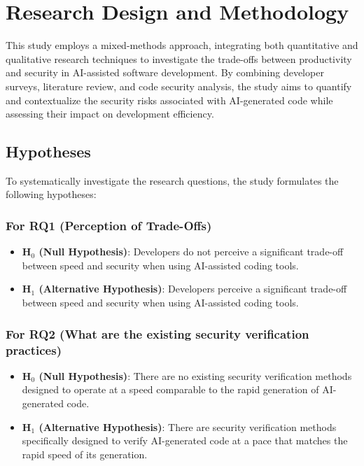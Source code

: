 \section{Research Design and Methodology}
This study employs a mixed-methods approach, integrating both quantitative and qualitative research techniques to investigate the trade-offs between productivity and security in AI-assisted software development. By combining developer surveys, literature review, and code security analysis, the study aims to quantify and contextualize the security risks associated with AI-generated code while assessing their impact on development efficiency.

\subsection{Hypotheses}

To systematically investigate the research questions, the study formulates the following hypotheses:

\subsubsection{For RQ1 (Perception of Trade-Offs)}

\begin{itemize}
    \item \textbf{H$_{0}$ (Null Hypothesis)}: Developers do not perceive a significant trade-off between speed and security when using AI-assisted coding tools.
    \item \textbf{H$_{1}$ (Alternative Hypothesis)}: Developers perceive a significant trade-off between speed and security when using AI-assisted coding tools.
\end{itemize}

\subsubsection{For RQ2 (What are the existing security verification practices)}

\begin{itemize}
    \item \textbf{H$_{0}$ (Null Hypothesis)}: There are no existing security verification methods designed to operate at a speed comparable to the rapid generation of AI-generated code.
    \item \textbf{H$_{1}$ (Alternative Hypothesis)}: There are security verification methods specifically designed to verify AI-generated code at a pace that matches the rapid speed of its generation.
\end{itemize}

